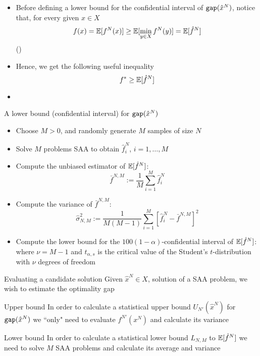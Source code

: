 \begin{frame}{ }
\begin{itemize}
\item Before defining a lower bound for the confidential interval of  ${\tt gap} (\hat x^N)$, notice that, for every given $x \in X$
\[
f(x)=\mathbb{E}[f^N(x)]\geq \mathbb{E}[\min_{y \in X} f^N(y)]=\mathbb{E}[\hat f^N]
\]
()
\pula

\item Hence, we get the following useful inequality
\[
f^*\geq \mathbb{E}[\hat f^N]
\]
\pula
\item {}
\end{itemize}
\end{frame}


\begin{frame}{A lower bound (confidential interval) for ${\tt gap}(\hat x^N)$}
\begin{itemize}
\item Choose $M>0$, and randomly generate $M$ samples of size  $N$
\pula
\item Solve $M$ problems SAA to obtain $\hat f^N_i$, $i=1,\ldots, M$
\pula
\item Compute the unbiased estimator of $\mathbb{E}[\hat f^N]$:
\[
\bar f^{N,M} :=\frac 1 M \sum_{i=1}^M \hat f^N_i
\]
\pula
\item Compute the variance of $\bar f^{N,M}$:
\[
\hat \sigma^2_{N,M}:=\frac{1}{M(M-1)}\sum_{i=1}^M[\hat f^{N}_i - \bar f^{N,M} ]^2
\]
\pula
\item Compute the lower bound for the $100(1-\alpha)$-confidential interval  of $\mathbb{E}[\hat f^N]$:
\azul{\[
L_N':= \bar f^{N,M} - t_{\alpha,\nu}\hat \sigma_{N,M}\,,
\]
}
where $\nu=M-1$ and $t_{\alpha,s}$ is the critical value of the Student's $t$-distribution with $\nu$ degrees of freedom
\end{itemize}
\end{frame}
%
\begin{frame}{Evaluating a candidate solution}
Given $ \hat x^N \in X $, solution of a SAA problem, we wish to estimate the optimality gap
\azul{
\[
{\tt gap} (\hat x^N) = f (\hat x^N) -f^* \geq 0
\]
}
\begin{block}{Upper bound}
In order to calculate a statistical upper bound  $ U_{N '} (\hat x^N) $ for $ {\tt gap} (\hat x^N) $  we ``only" need to evaluate $ f^{N'}( x^N) $ and calculate its variance
\azul{
\[
U_{N}'(\hat x^N):= f^{N'}(\hat x^N) + z_{\alpha}\hat \sigma_{N'}(\hat x^N)
\]
}
\end{block}
\pause
\begin{block}{Lower bound}
In order to calculate a statistical lower bound $ L_{N, M}$ to $\mathbb{E}[\hat f^N]$ we need to solve $ M $ SAA problems
and calculate its average and variance
\azul{\[
L_N':= \bar f^{N,M} - t_{\alpha,\nu}\hat \sigma_{N,M}
\]
}
\end{block}
\end{frame}


